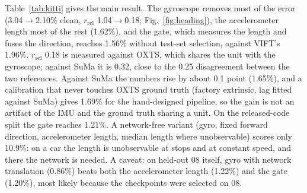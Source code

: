 \documentclass[letterpaper,journal]{IEEEtran}
\begin{document}
\begin{table}[t]
\caption{KITTI 05/07/10, $t_\mathrm{rel}$\,\% (mean $\pm$ sd over 3 seeds) / $r_\mathrm{rel}$. Clean: paper-text split, checkpoint selected on held-out 08. With 08: checkpoint selected on the test drives, as in the released code. SuMa: lidar-SLAM reference independent of the IMU; against SuMa, $r_\mathrm{rel}$ is 0.32 for every row with gyro rotation.}
\label{tab:kitti}
\centering\small
\setlength{\tabcolsep}{3pt}
\end{table}

Table~\ref{tab:kitti} gives the main result. The gyroscope removes most of the error (3.04$\to$2.10\% clean, $r_\mathrm{rel}$ 1.04$\to$0.18; Fig.~\ref{fig:heading}), the accelerometer length most of the rest (1.62\%), and the gate, which measures the length and fuses the direction, reaches 1.56\% without test-set selection, against VIFT's 1.96\%. $r_\mathrm{rel}$ 0.18 is measured against OXTS, which shares the unit with the gyroscope; against SuMa it is 0.32, close to the 0.25 disagreement between the two references. Against SuMa the numbers rise by about 0.1 point (1.65\%), and a calibration that never touches OXTS ground truth (factory extrinsic, lag fitted against SuMa) gives 1.69\% for the hand-designed pipeline, so the gain is not an artifact of the IMU and the ground truth sharing a unit. On the released-code split the gate reaches 1.21\%. A network-free variant (gyro, fixed forward direction, accelerometer length, median length where unobservable) scores only 10.9\%: on a car the length is unobservable at stops and at constant speed, and there the network is needed. A caveat: on held-out 08 itself, gyro with network translation (0.86\%) beats both the accelerometer length (1.22\%) and the gate (1.20\%), most likely because the checkpoints were selected on 08.
\end{document}
